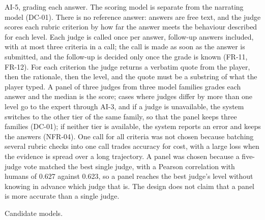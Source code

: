 AI-5, grading each answer. The scoring model is separate from the narrating model (DC-01). There is no reference answer: answers are free text, and the judge scores each rubric criterion by how far the answer meets the behaviour described for each level. Each judge is called once per answer, follow-up answers included, with at most three criteria in a call; the call is made as soon as the answer is submitted, and the follow-up is decided only once the grade is known (FR-11, FR-12). For each criterion the judge returns a verbatim quote from the player, then the rationale, then the level, and the quote must be a substring of what the player typed. A panel of three judges from three model families grades each answer and the median is the score; cases where judges differ by more than one level go to the expert through AI-3, and if a judge is unavailable, the system switches to the other tier of the same family, so that the panel keeps three families (DC-01); if neither tier is available, the system reports an error and keeps the answers (NFR-04). One call for all criteria was not chosen because batching several rubric checks into one call trades accuracy for cost, with a large loss when the evidence is spread over a long trajectory\cite{r122}. A panel was chosen because a five-judge vote matched the best single judge, with a Pearson correlation with humans of 0.627 against 0.623\cite{r123}, so a panel reaches the best judge's level without knowing in advance which judge that is. The design does not claim that a panel is more accurate than a single judge.

Candidate models.

